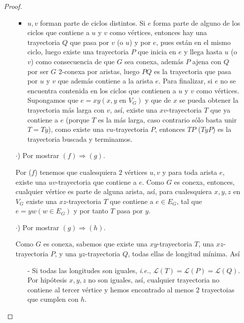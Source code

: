 \documentclass{article}
\begin{document}
\begin{enumerate}
\begin{proof}
\begin{itemize}
\begin{itemize}
      \item $u, v$ forman parte de ciclos distintos. Si $e$ forma
        parte de alguno de los ciclos que contiene a $u$ y $v$ como
        vértices, entonces hay una trayectoria $Q$ que pasa por $v$
        (o $u$) y por $e$, pues están en el mismo ciclo, luego existe
        una trayectoria $P$ que inicia en $e$ y llega hasta $u$ (o $v$)
        como consecuencia de que $G$ sea conexa, además $P$ ajena con $Q$
        por ser $G$ $2$-conexa por aristas, luego $PQ$ es la trayectoria
        que pasa por $u$ y $v$ que además contiene a la arista $e$. Para
        finalizar, si $e$ no se encuentra contenida en los ciclos que
        contienen a $u$ y $v$ como vértices. Supongamos que
        $e = xy (x, y \text{ en } V_G)$ y que de $x$ se pueda obtener la
        trayectoria más larga con $v$, así, existe una $xv$-trayectoria $T$
        que ya contiene a $e$ (porque $T$ es la más larga, caso contrario
        sólo basta unir $T = Ty$), como existe una $vu$-trayectoria $P$,
        entonces $TP$ ($TyP$) es la trayectoria buscada y terminamos.
      \end{itemize}
    \item[$\cdot$)] Por mostrar $(f) \Rightarrow (g)$.
      
      Por ($f$) tenemos que cualesquiera $2$ vértices $u, v$ y para
      toda arista $e$, existe una $uv$-trayectoria que contiene a $e$.
      Como $G$ es conexa, entonces, cualquier vértice es parte de alguna
      arista, así, para cualesquiera $x, y, z$ en $V_G$ existe una
      $xz$-trayectoria $T$ que contiene a $e \in E_G$, tal que $e =
      yw (w \in E_G)$ y por tanto $T$ pasa por $y$.
    \item[$\cdot$)] Por mostrar $(g) \Rightarrow (h)$.
      
      Como $G$ es conexa, sabemos que existe una $xy$-trayectoria $T$,
      una $xz$-trayectoria $P$, y una $yz$-trayectoria $Q$, todas ellas
      de longitud mínima. Así
      \begin{itemize}
      \item[-] Si todas las longitudes son iguales, \textit{i.e.}, $\mathcal{L}(T)
        = \mathcal{L}(P) = \mathcal{L}(Q)$. Por hipótesis $x,y,z$ no son iguales,
        así, cualquier trayectoria no contiene al tercer vértice y hemos encontrado
        al menos $2$ trayectoias que cumplen con $h$.
        

\end{itemize}
\end{itemize}
\end{proof}
\end{enumerate}
\end{document}
